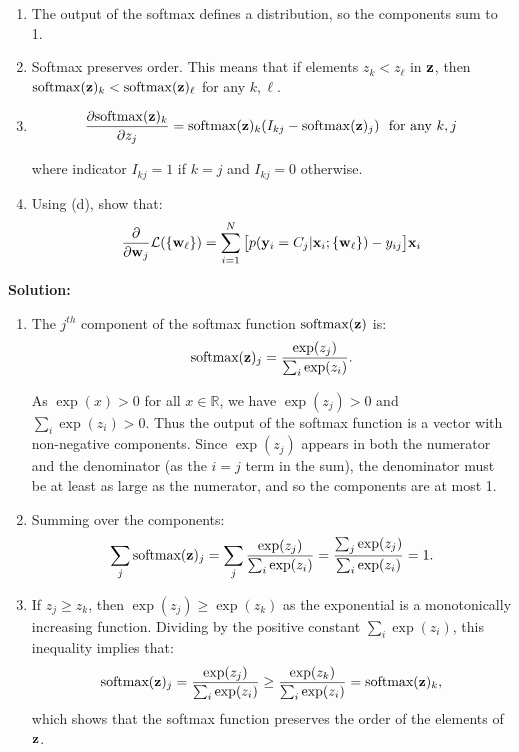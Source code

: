 \documentclass[12pt,letterpaper]{article}
\begin{document}
\begin{enumerate}
{{\begin{enumerate}
      \item The output of the softmax defines a distribution, so the components sum to 1.

      \item Softmax preserves order. This means that if elements $z_k < z_\ell$
    in $\mathbf{z}$, then  $\mathrm{softmax}(\mathbf{z})_k < \mathrm{softmax}(\mathbf{z})_{\ell}$ for any $k,\ell$. 
      \item \[\frac{\partial \mathrm{softmax}(\mathbf{z})_k }{\partial z_j} = \mathrm{softmax}(\mathbf{z})_k (I_{kj} - \mathrm{softmax}(\mathbf{z})_j) \ \ \text{for\ any\ } k, j  \]

    where indicator $I_{kj}=1$ if $k=j$ and $I_{kj}=0$ otherwise.

    \item Using (d), show that:
       \[ \frac{\partial }{\partial \mathbf{w}_j} \mathcal{L}(\{\mathbf{w}_{\ell}\}) = \sum_{i=1}^N 
       \big[p(\mathbf{y}_i = C_j | \mathbf{x}_i; \{\mathbf{w}_\ell\}) - y_{ij} \big] \mathbf{x}_i  \]
    
  \end{enumerate}
}}

  \newpage

  \textbf{Solution:}

        \begin{enumerate}
            
            \item  The $j^{th}$ component of the softmax function $\text{softmax}({\bf z})$ is:
            \[\text{softmax}({\bf z})_j = \frac{\exp(z_j)}{\sum_i \exp(z_i)}.\]
            
            As $\exp(x)>0$ for all $x\in\mathbb R$, we have $\exp(z_j)>0$ and $\sum_i \exp(z_i)>0$. Thus the output of the softmax function is a vector with non-negative components. Since $\exp(z_j)$ appears in both the numerator and the denominator (as the $i=j$ term in the sum), the denominator must be at least as large as the numerator, and so the components are at most 1.
            
            
            \item  Summing over the components:
            \[\sum_j \text{softmax}({\bf z})_j = \sum_j \frac{\exp(z_j)}{\sum_i \exp(z_i)} =  \frac{\sum_j\exp(z_j)}{\sum_i \exp(z_i)}  = 1.\]

            
            \item If $z_j\ge z_k$, then $\exp(z_j)\ge \exp(z_k)$ as the exponential is a monotonically increasing function. Dividing by the positive constant $\sum_i \exp(z_i)$, this inequality implies that:
            \[\text{softmax}({\bf z})_j = \frac{\exp(z_j)}{\sum_i \exp(z_i)} \ge \frac{\exp(z_k)}{\sum_i \exp(z_i)} = \text{softmax}({\bf z})_k,\]
            which shows that the softmax function preserves the order of the elements of ${\bf z}$.
            

\end{enumerate}
\end{enumerate}
\end{document}
